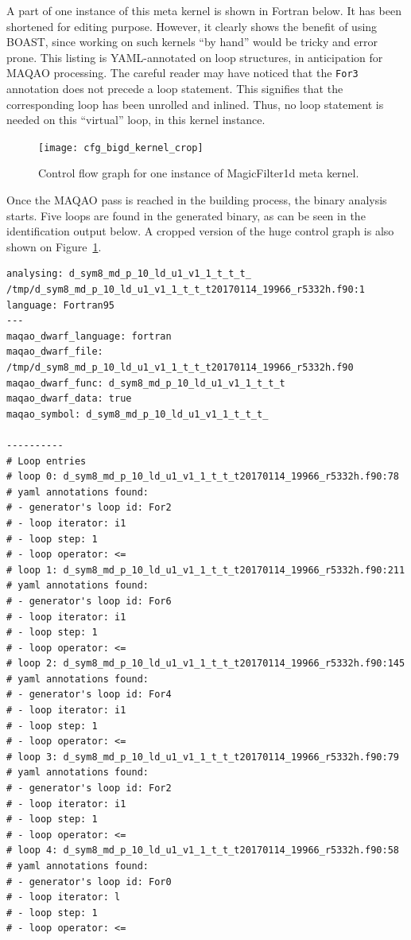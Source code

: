 \documentclass[11pt, a4paper, twoside]{montblanc2}
\begin{document}
A part of one instance of this meta kernel is shown in Fortran below. It has 
been shortened for editing purpose. However, it clearly shows the benefit of 
using BOAST, since working on such kernels ``by hand'' would be tricky and error 
prone. This listing is YAML-annotated on loop structures, in anticipation for 
MAQAO processing. The careful reader may have noticed that the \texttt{For3} 
annotation does not precede a loop statement. This signifies that the 
corresponding loop has been unrolled and inlined. Thus, no loop statement is 
needed on this ``virtual'' loop, in this kernel instance.


\begin{figure}[p]
  \centering
\texttt{[image: cfg\_bigd\_kernel\_crop]}
\caption{Control flow graph for one instance of MagicFilter1d meta 
kernel.}\label{fig:cfgmf1d}
\end{figure}

Once the MAQAO pass is reached in the building process, the binary analysis 
starts. Five loops are found in the generated binary, as can be seen in the 
identification output below. A cropped version of the huge control graph is also 
shown on Figure~\ref{fig:cfgmf1d}.

\begin{verbatim}
analysing: d_sym8_md_p_10_ld_u1_v1_1_t_t_t_
/tmp/d_sym8_md_p_10_ld_u1_v1_1_t_t_t20170114_19966_r5332h.f90:1
language: Fortran95
---
maqao_dwarf_language: fortran
maqao_dwarf_file: /tmp/d_sym8_md_p_10_ld_u1_v1_1_t_t_t20170114_19966_r5332h.f90
maqao_dwarf_func: d_sym8_md_p_10_ld_u1_v1_1_t_t_t
maqao_dwarf_data: true
maqao_symbol: d_sym8_md_p_10_ld_u1_v1_1_t_t_t_

----------
# Loop entries
# loop 0: d_sym8_md_p_10_ld_u1_v1_1_t_t_t20170114_19966_r5332h.f90:78
# yaml annotations found:
# - generator's loop id: For2
# - loop iterator: i1
# - loop step: 1
# - loop operator: <=
# loop 1: d_sym8_md_p_10_ld_u1_v1_1_t_t_t20170114_19966_r5332h.f90:211
# yaml annotations found:
# - generator's loop id: For6
# - loop iterator: i1
# - loop step: 1
# - loop operator: <=
# loop 2: d_sym8_md_p_10_ld_u1_v1_1_t_t_t20170114_19966_r5332h.f90:145
# yaml annotations found:
# - generator's loop id: For4
# - loop iterator: i1
# - loop step: 1
# - loop operator: <=
# loop 3: d_sym8_md_p_10_ld_u1_v1_1_t_t_t20170114_19966_r5332h.f90:79
# yaml annotations found:
# - generator's loop id: For2
# - loop iterator: i1
# - loop step: 1
# - loop operator: <=
# loop 4: d_sym8_md_p_10_ld_u1_v1_1_t_t_t20170114_19966_r5332h.f90:58
# yaml annotations found:
# - generator's loop id: For0
# - loop iterator: l
# - loop step: 1
# - loop operator: <=
\end{verbatim}
\end{document}
